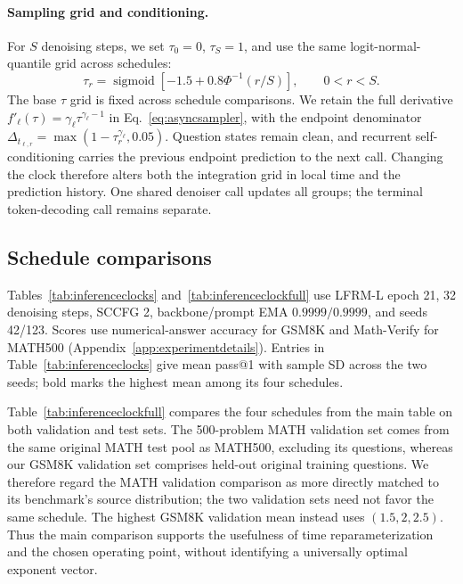 \documentclass{article}
\begin{document}
\paragraph{Sampling grid and conditioning.}
For $S$ denoising steps, we set $\tau_0=0$, $\tau_S=1$, and use the same logit-normal-quantile grid across schedules:
\begin{equation}
 \tau_r=\operatorname{sigmoid}\!\left[-1.5+0.8\Phi^{-1}(r/S)\right],
 \qquad 0<r<S.
\end{equation}
The base $\tau$ grid is fixed across schedule comparisons. We retain the full derivative $f'_\ell(\tau)=\gamma_\ell\tau^{\gamma_\ell-1}$ in Eq.~\eqref{eq:asyncsampler}, with the endpoint denominator $\Delta_{t_{\ell,r}}=\max(1-\tau_r^{\gamma_\ell},0.05)$. Question states remain clean, and recurrent self-conditioning carries the previous endpoint prediction to the next call. Changing the clock therefore alters both the integration grid in local time and the prediction history. One shared denoiser call updates all groups; the terminal token-decoding call remains separate.

\subsection{Schedule comparisons}
Tables~\ref{tab:inferenceclocks} and~\ref{tab:inferenceclockfull} use LFRM-L epoch 21, 32 denoising steps, SCCFG 2, backbone/prompt EMA $0.9999/0.9999$, and seeds 42/123. Scores use numerical-answer accuracy for GSM8K and Math-Verify for MATH500 (Appendix~\ref{app:experimentdetails}). Entries in Table~\ref{tab:inferenceclocks} give mean pass@1 with sample SD across the two seeds; bold marks the highest mean among its four schedules.

Table~\ref{tab:inferenceclockfull} compares the four schedules from the main table on both validation and test sets. The 500-problem MATH validation set comes from the same original MATH test pool as MATH500, excluding its questions, whereas our GSM8K validation set comprises held-out original training questions. We therefore regard the MATH validation comparison as more directly matched to its benchmark's source distribution; the two validation sets need not favor the same schedule. The highest GSM8K validation mean instead uses $(1.5,2,2.5)$. Thus the main comparison supports the usefulness of time reparameterization and the chosen operating point, without identifying a universally optimal exponent vector.
\end{document}
